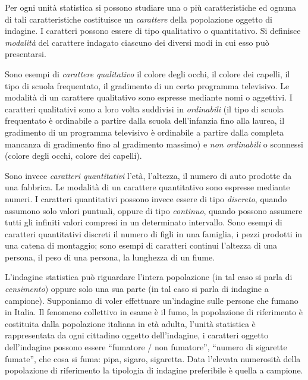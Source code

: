 \begin{definizione}
Per ogni unità statistica si possono studiare una o più caratteristiche ed 
ognuna di tali caratteristiche costituisce un \emph{carattere} della 
popolazione oggetto
di indagine. I caratteri possono essere di tipo qualitativo o quantitativo.
Si definisce \emph{modalità} del carattere indagato ciascuno dei diversi 
modi in cui esso può presentarsi.
\end{definizione}

Sono esempi di \emph{carattere qualitativo} il colore degli occhi, il 
colore dei capelli, il tipo di scuola frequentato, il gradimento di un 
certo programma televisivo.
Le modalità di un carattere qualitativo sono espresse mediante nomi o 
aggettivi.
I caratteri qualitativi sono a loro volta suddivisi in \emph{ordinabili} 
(il tipo di scuola frequentato è ordinabile a partire dalla scuola 
dell'infanzia fino alla laurea,
il gradimento di un programma televisivo è ordinabile a partire dalla 
completa mancanza di gradimento fino al gradimento massimo) e \emph{non 
ordinabili} o sconnessi
(colore degli occhi, colore dei capelli).

Sono invece \emph{caratteri quantitativi} l'età, l'altezza, il numero di 
auto prodotte da una fabbrica. Le modalità di un carattere quantitativo 
sono espresse mediante numeri.
I caratteri quantitativi possono invece essere di tipo \emph{discreto}, 
quando assumono solo valori puntuali, oppure di tipo \emph{continuo}, 
quando possono assumere
tutti gli infiniti valori compresi in un determinato intervallo. Sono 
esempi di caratteri quantitativi discreti il numero di figli in una 
famiglia,
i pezzi prodotti in una catena di montaggio; sono esempi di caratteri 
continui l'altezza di una persona, il peso di una persona, la lunghezza di 
un fiume.

L'indagine statistica può riguardare l'intera popolazione (in tal caso si 
parla di \emph{censimento}) oppure solo una sua parte (in tal caso si parla 
di indagine a campione).
Supponiamo di voler effettuare un'indagine sulle persone che fumano in 
Italia. Il fenomeno collettivo in esame è il fumo, la popolazione di 
riferimento
è costituita dalla popolazione italiana in età adulta, l'unità statistica è 
rappresentata da ogni cittadino oggetto dell'indagine, i caratteri oggetto
dell'indagine possono essere ``fumatore / non fumatore'', ``numero di 
sigarette fumate'', che cosa si fuma: pipa, sigaro, sigaretta. Data 
l'elevata numerosità
della popolazione di riferimento la tipologia di indagine preferibile è 
quella a campione.


